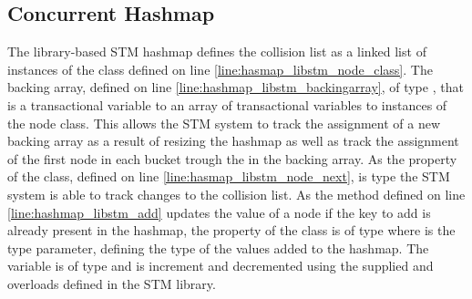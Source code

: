 \subsection{Concurrent Hashmap}
The library-based \ac{STM} hashmap defines the collision list as a linked list of instances of the  class defined on line \ref{line:hasmap_libstm_node_class}. The backing array, defined on line \ref{line:hashmap_libstm_backingarray}, of type , that is a transactional variable to an array of transactional variables to instances of the node  class. This allows the \ac{STM} system to track the assignment of a new backing array as a result of resizing the hashmap as well as track the assignment of the first node in each bucket trough the  in the backing array. As the  property of the  class, defined on line \ref{line:hasmap_libstm_node_next}, is type  the \ac{STM} system is able to track changes to the collision list. As the  method defined on line \ref{line:hashmap_libstm_add} updates the value of a node if the key to add is already present in the hashmap, the  property of the  class is of type  where  is the type parameter, defining the type of the values added to the hashmap. The  variable is of type  and is increment and decremented using the supplied \bscode{++} and \bscode{--} overloads defined in the \ac{STM} library.
